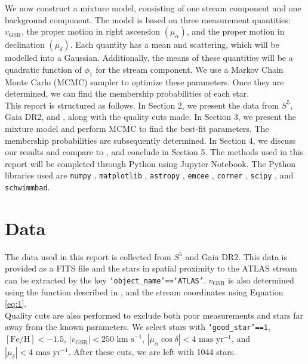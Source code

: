 \documentclass{article}
\begin{document}
We now construct a mixture model, consisting of one stream component and one background component. The model is based on three measurement quantities: $v_\text{GSR}$, the proper motion in right ascension $(\mu_\alpha)$, and the proper motion in declination $(\mu_\delta)$. Each quantity has a mean and scattering, which will be modelled into a Gaussian. Additionally, the means of these quantities will be a quadratic function of $\phi_1$ for the stream component. We use a Markov Chain Monte Carlo (MCMC) sampler to optimize these parameters. Once they are determined, we can find the membership probabilities of each star.\\

This report is structured as follows. In Section 2, we present the data from $S^5$, Gaia DR2, and \citet{2021ApJ...911..149L}, along with the quality cuts made. In Section 3, we present the mixture model and perform MCMC to find the best-fit parameters. The membership probabilities are subsequently determined. In Section 4, we discuss our results and compare to \citet{2021ApJ...911..149L}, and conclude in Section 5. The methods used in this report will be completed through Python using Jupyter Notebook. The Python libraries used are \texttt{numpy} \citep{harris2020array}, \texttt{matplotlib} \citep{Hunter:2007}, \texttt{astropy} \citep{2022ApJ...935..167A}, \texttt{emcee} \citep{Foreman_Mackey_2013}, \texttt{corner} \citep{dan_foreman_mackey_2023_7808805}, \texttt{scipy} \citep{2020SciPy-NMeth}, and \texttt{schwimmbad}. 

\section{Data}

The data used in this report is collected from $S^5$ and Gaia DR2. This data is provided as a FITS file and the stars in spatial proximity to the ATLAS stream can be extracted by the key \texttt{`object\_name'==`ATLAS'}. $v_\text{GSR}$ is also determined using the function described in \citet{Price-Whelan_2023}, and the stream coordinates using Equation \ref{eq:1}.\\

Quality cuts are also performed to exclude both poor measurements and stars far away from the known parameters. We select stars with \texttt{`good\_star'==1}, $[\text{Fe/H}]<-1.5$, $|v_\text{GSR}|<250 \text{ km s}^{-1}$, $|\mu_\alpha\cos\delta|<4\text{ mas yr}^{-1}$, and $|\mu_\delta|<4\text{ mas yr}^{-1}$. After these cuts, we are left with 1044 stars.\\
\end{document}

